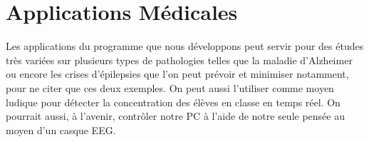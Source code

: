 	\section{Applications Médicales} %
		Les applications du programme que nous développons peut servir pour des études très variées sur plusieurs types de pathologies telles que la maladie d'Alzheimer ou encore les crises d'épilepsies que l'on peut prévoir et minimiser notamment, pour ne citer que ces deux exemples. On peut aussi l'utiliser comme moyen ludique pour détecter la concentration des élèves en classe en temps réel. On pourrait aussi, à l'avenir, contrôler notre PC à l'aide de notre seule pensée au moyen d'un casque EEG.
	\label{sec:application_médical}
	
				
	
	
	
	
